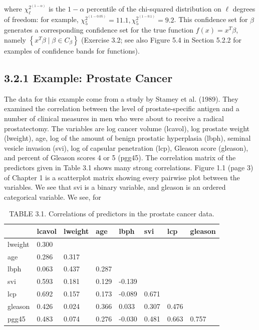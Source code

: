 \documentclass[10pt]{article}
\begin{document}
where $\chi_{\ell}^{2^{(1-\alpha)}}$ is the $1-\alpha$ percentile of the chi-squared distribution on $\ell$ degrees of freedom: for example, $\chi_{5}^{2^{(1-0.05)}}=11.1, \chi_{5}^{2^{(1-0.1)}}=9.2$. This confidence set for $\beta$ generates a corresponding confidence set for the true function $f(x)=x^{T} \beta$, namely $\left\{x^{T} \beta \mid \beta \in C_{\beta}\right\}$ (Exercise 3.2; see also Figure 5.4 in Section 5.2.2 for examples of confidence bands for functions).

\subsection*{3.2.1 Example: Prostate Cancer}
The data for this example come from a study by Stamey et al. (1989). They examined the correlation between the level of prostate-specific antigen and a number of clinical measures in men who were about to receive a radical prostatectomy. The variables are log cancer volume (lcavol), log prostate weight (lweight), age, log of the amount of benign prostatic hyperplasia (lbph), seminal vesicle invasion (svi), log of capsular penetration (lcp), Gleason score (gleason), and percent of Gleason scores 4 or 5 (pgg45). The correlation matrix of the predictors given in Table 3.1 shows many strong correlations. Figure 1.1 (page 3) of Chapter 1 is a scatterplot matrix showing every pairwise plot between the variables. We see that svi is a binary variable, and gleason is an ordered categorical variable. We see, for

\begin{table}[h]
\begin{center}
\captionsetup{labelformat=empty}
\caption{TABLE 3.1. Correlations of predictors in the prostate cancer data.}
\begin{tabular}{|l|l|l|l|l|l|l|l|}
\hline
 & lcavol & lweight & age & lbph & svi & lcp & gleason \\
\hline
lweight & 0.300 &  &  &  &  &  &  \\
\hline
age & 0.286 & 0.317 &  &  &  &  &  \\
\hline
lbph & 0.063 & 0.437 & 0.287 &  &  &  &  \\
\hline
svi & 0.593 & 0.181 & 0.129 & -0.139 &  &  &  \\
\hline
lcp & 0.692 & 0.157 & 0.173 & -0.089 & 0.671 &  &  \\
\hline
gleason & 0.426 & 0.024 & 0.366 & 0.033 & 0.307 & 0.476 &  \\
\hline
pgg45 & 0.483 & 0.074 & 0.276 & -0.030 & 0.481 & 0.663 & 0.757 \\
\hline
\end{tabular}
\end{center}
\end{table}
\end{document}
